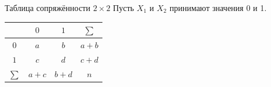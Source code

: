 \documentclass[9pt,pdf,utf8,hyperref={unicode},aspectratio=169]{beamer}
\begin{document}
\begin{frame}{Таблица сопряжённости $2 \times 2$}
	Пусть $X_{1}$ и $X_{2}$ принимают значения 0 и 1.
	
	\bigskip
	
	\begin{center}
		\begin{tabular}{|c|c|c|c|}
			\hline
			\diagbox{$X_1$}{$X_2$} & $0$   & $1$   & $\sum$\\\hline
			$0$                       & $a$ & $b$ & $a+b$ \\\hline
			$1$                       & $c$ & $d$ & $c+d$ \\\hline
			$\sum$                  &$a+c$&$b+d$& $n$ \\\hline
		\end{tabular}
	\end{center}
\end{frame}
\end{document}

